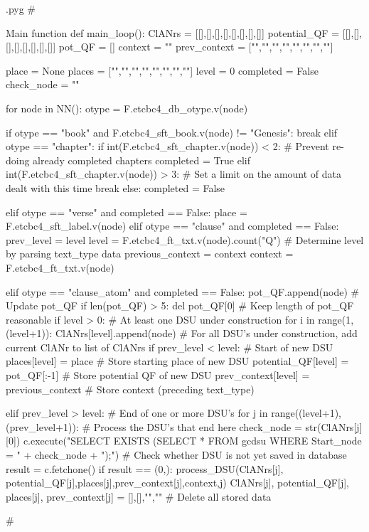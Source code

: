 \documentclass{report}
\makeatletter
\newenvironment{python}{%
  \VerbatimEnvironment
  \minted@resetoptions
  \setkeys{minted@opt}{}
      \begin{VerbatimOut}{\jobname.pyg}}
{%
      \end{VerbatimOut}
      \minted@pygmentize{python}
      \DeleteFile{\jobname.pyg}}
\makeatother
\begin{document}
\begin{python}
#{{{ Main function
def main_loop():
    ClANrs =       [[],[],[],[],[],[],[],[]]
    potential_QF = [[],[],[],[],[],[],[],[]]
    pot_QF = []
    context = ""
    prev_context = ["","","","","","","",""]

    place = None
    places =       ["","","","","","","",""]
    level = 0
    completed = False
    check_node = ""

    for node in NN():
        otype = F.etcbc4_db_otype.v(node)

        if otype == "book" and F.etcbc4_sft_book.v(node) != "Genesis":
            break
        elif otype == "chapter":
            if int(F.etcbc4_sft_chapter.v(node)) < 2:    # Prevent re-doing already completed chapters
                completed = True
            elif int(F.etcbc4_sft_chapter.v(node)) > 3:    # Set a limit on the amount of data dealt with this time
                break
            else:
                completed = False

        elif otype == "verse" and completed == False:
            place = F.etcbc4_sft_label.v(node)
        elif otype == "clause" and completed == False:
            prev_level = level
            level = F.etcbc4_ft_txt.v(node).count("Q")      # Determine level by parsing text_type data
            previous_context = context
            context = F.etcbc4_ft_txt.v(node)

        elif otype == "clause_atom" and completed == False:
            pot_QF.append(node)     # Update pot_QF
            if len(pot_QF) > 5:
                del pot_QF[0]       # Keep length of pot_QF reasonable
            if level > 0:           # At least one DSU under construction
                for i in range(1,(level+1)):
                    ClANrs[level].append(node)   # For all DSU's under construction, add current ClANr to list of ClANrs
            if prev_level < level:                  # Start of new DSU
                places[level] = place               # Store starting place of new DSU
                potential_QF[level] = pot_QF[:-1]   # Store potential QF of new DSU
                prev_context[level] = previous_context    # Store context (preceding text_type)

            elif prev_level > level:                # End of one or more DSU's
                for j in range((level+1),(prev_level+1)): # Process the DSU's that end here
                    check_node = str(ClANrs[j][0])
                    c.execute("SELECT EXISTS (SELECT * FROM gcdsu WHERE Start_node = " + check_node + ");") # Check whether DSU is not yet saved in database
                    result = c.fetchone()
                    if result == (0,):
                        process_DSU(ClANrs[j], potential_QF[j],places[j],prev_context[j],context,j)
                    ClANrs[j], potential_QF[j], places[j], prev_context[j] = [],[],"",""    # Delete all stored data

#}}}
\end{python}
\end{document}
